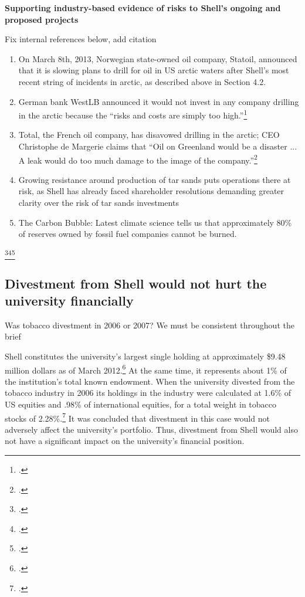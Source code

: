 \textbf{Supporting industry-based evidence of risks to Shell's ongoing and proposed projects}

\begin{vcom}
	Fix internal references below, add citation
\end{vcom}

\begin{enumerate}
	\item On March 8th, 2013, Norwegian state-owned oil company, Statoil, announced that it is slowing plans to drill for oil in US arctic waters after Shell's most recent string of incidents in arctic, as described above in Section 4.2.
	\item German bank WestLB announced it would not invest in any company drilling in the arctic because the ``risks and costs are simply too high.''\footcite[][]{Naidoo_2012}
	\item Total, the French oil company, has disavowed drilling in the arctic; CEO Christophe de Margerie claims that ``Oil on Greenland would be a disaster ... A leak would do too much damage to the image of the company.''\footcite[][]{NewsWire_2012}
	\item Growing resistance around production of tar sands puts operations there at risk, as Shell has already faced shareholder resolutions demanding greater clarity over the risk of tar sands investments
	\item The Carbon Bubble: Latest climate science tells us that approximately 80\% of reserves owned by fossil fuel companies cannot be burned.
\end{enumerate}\footcite[][]{carbontracker}\footcite[][]{UNEP_2009}\footcite[][]{HSBC_2013}


	\subsection{Divestment from Shell would not hurt the university financially}
	
\begin{vcom}
	Was tobacco divestment in 2006 or 2007? We must be consistent throughout the brief
\end{vcom}

Shell constitutes the university's largest single holding at approximately \$9.48 million dollars as of March 2012.\footcite[][]{UTAM_2012}  
At the same time, it represents about 1\% of the institution's total known endowment. 
When the university divested from the tobacco industry in 2006 its holdings in the industry were calculated at 1.6\% of US equities and .98\% of international equities, for a total weight in tobacco stocks of 2.28\%.\footcite[][]{TobaccoReport_2007}
It was concluded that divestment in this case would not adversely affect the university's portfolio. 
Thus, divestment from Shell would also not have a significant impact on the university's financial position. 



